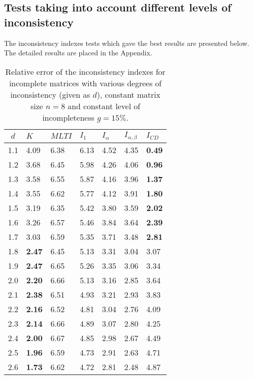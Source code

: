 \subsection{Tests taking into account different levels of inconsistency}
The inconsistency indexes tests which gave the best results are presented below. The detailed results are placed in the Appendix.
\begin{table}[!ht]
\begin{center}
\caption{Relative error of the inconsistency indexes for incomplete matrices with various degrees of inconsistency (given as $d$), constant matrix size $n=8$ and constant level of incompleteness $g=15\%$.}
\label{tab:results3}
\begin{tabular}{|c||llllll|}
\hline $d$ & $\textit{K}$ & $\textit{MLTI}$ & $I_1$ & $I_{\alpha}$ & $I_{\alpha,\beta}$ & $I_{CD}$  \\ \hline \hline
1.1 & 4.09 & 6.38 & 6.13 & 4.52 & 4.35 & \textbf{0.49} \\ \hline
1.2 & 3.68 & 6.45 & 5.98 & 4.26 & 4.06 & \textbf{0.96} \\ \hline
1.3 & 3.58 & 6.55 & 5.87 & 4.16 & 3.96 & \textbf{1.37} \\ \hline
1.4 & 3.55 & 6.62 & 5.77 & 4.12 & 3.91 & \textbf{1.80} \\ \hline
1.5 & 3.19 & 6.35 & 5.42 & 3.80 & 3.59 & \textbf{2.02} \\ \hline
1.6 & 3.26 & 6.57 & 5.46 & 3.84 & 3.64 & \textbf{2.39} \\ \hline
1.7 & 3.03 & 6.59 & 5.35 & 3.71 & 3.48 & \textbf{2.81} \\ \hline
1.8 & \textbf{2.47} & 6.45 & 5.13 & 3.31 & 3.04 & 3.07 \\ \hline
1.9 & \textbf{2.47} & 6.65 & 5.26 & 3.35 & 3.06 & 3.34 \\ \hline
2.0 & \textbf{2.20} & 6.66 & 5.13 & 3.16 & 2.85 & 3.64 \\ \hline
2.1 & \textbf{2.38} & 6.51 & 4.93 & 3.21 & 2.93 & 3.83 \\ \hline
2.2 & \textbf{2.16} & 6.52 & 4.81 & 3.04 & 2.76 & 4.09 \\ \hline
2.3 & \textbf{2.14} & 6.66 & 4.89 & 3.07 & 2.80 & 4.25 \\ \hline
2.4 & \textbf{2.00} & 6.67 & 4.85 & 2.98 & 2.67 & 4.49 \\ \hline
2.5 & \textbf{1.96} & 6.59 & 4.73 & 2.91 & 2.63 & 4.71 \\ \hline
2.6 & \textbf{1.73} & 6.62 & 4.72 & 2.81 & 2.48 & 4.87 \\ \hline

\end{tabular}
\end{center}
\end{table}
